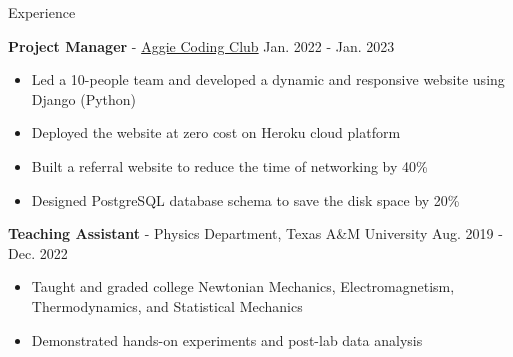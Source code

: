 \documentclass{resume}
\begin{document}
\begin{rSection}{Experience}
    \item \textbf{Project Manager} - \href{https://aggiecodingclub.com}{Aggie Coding Club} \hfill Jan. 2022 - Jan. 2023
        \begin{itemize}
        \item Led a 10-people team and developed a dynamic and responsive website using Django (Python)
        \item Deployed the website at zero cost on Heroku cloud platform
        \item Built a referral website to reduce the time of networking by 40\%
        \item Designed PostgreSQL database schema to save the disk space by 20\%
        \end{itemize}

    \item \textbf{Teaching Assistant} - Physics Department, Texas A\&M University \hfill Aug. 2019 - Dec. 2022
        \begin{itemize}
        \item Taught and graded college Newtonian Mechanics, Electromagnetism, Thermodynamics, and Statistical Mechanics
        \item Demonstrated hands-on experiments and post-lab data analysis
        \end{itemize}
\end{rSection}


\end{document}
